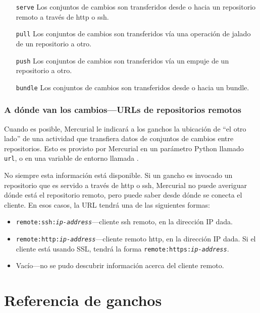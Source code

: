 \begin{itemize}
\item[\texttt{serve}] Los conjuntos de cambios son transferidos desde
  o hacia un repositorio remoto a través de http o ssh.
\item[\texttt{pull}] Los conjuntos de cambios son transferidos vía una
  operación de jalado de un repositorio a otro.
\item[\texttt{push}] Los conjuntos de cambios son transferidos vía un
  empuje de un repositorio a otro.
\item[\texttt{bundle}] Los conjuntos de cambios son transferidos desde
  o hacia un bundle.
\end{itemize}

\subsubsection{A dónde van los cambios---URLs de repositorios remotos}
\label{sec:hook:url}

Cuando es posible, Mercurial le indicará a los ganchos la ubicación de
``el otro lado'' de una actividad que transfiera datos de conjuntos de
cambios entre repositorios. Esto es provisto por Mercurial en un
parámetro Python llamado \texttt{url}, o en una variable de entorno
llamada .

No siempre esta información está disponible. Si un gancho es invocado
un repositorio que es servido a través de http o ssh, Mercurial no
puede averiguar dónde está el repositorio remoto, pero puede saber
desde dónde se conecta el cliente. En esos casos, la URL tendrá una de
las siguientes formas:
\begin{itemize}
\item \texttt{remote:ssh:\emph{ip-address}}---cliente ssh remoto, en
  la dirección IP dada.
\item \texttt{remote:http:\emph{ip-address}}---cliente remoto http, en
  la dirección IP dada. Si el cliente está usando SSL, tendrá la forma
  \texttt{remote:https:\emph{ip-address}}.
\item Vacío---no se pudo descubrir información acerca del cliente
  remoto.
\end{itemize}

\section{Referencia de ganchos}


